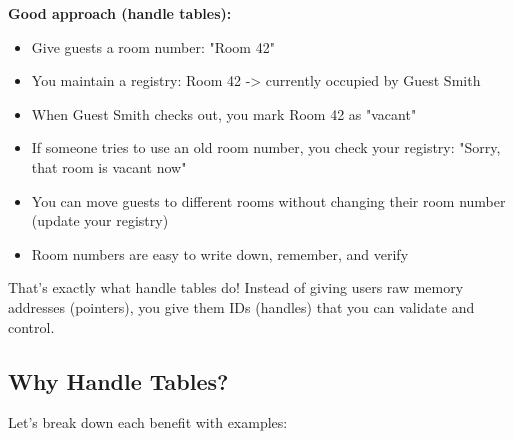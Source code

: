\textbf{Good approach (handle tables):}
\begin{itemize}
    \item Give guests a room number: "Room 42"
    \item You maintain a registry: Room 42 -> currently occupied by Guest Smith
    \item When Guest Smith checks out, you mark Room 42 as "vacant"
    \item If someone tries to use an old room number, you check your registry: "Sorry, that room is vacant now"
    \item You can move guests to different rooms without changing their room number (update your registry)
    \item Room numbers are easy to write down, remember, and verify
\end{itemize}

That's exactly what handle tables do! Instead of giving users raw memory addresses (pointers), you give them IDs (handles) that you can validate and control.

\subsection{Why Handle Tables?}

Let's break down each benefit with examples:

